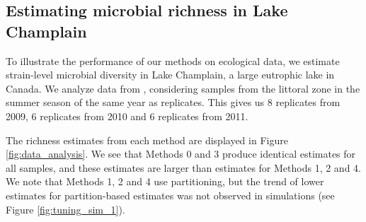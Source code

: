 \documentclass[12pt]{article}
\theoremstyle{break}
\theoremstyle{break}
\begin{document}
\subsection{Estimating microbial richness in Lake Champlain}

To illustrate the performance of our methods on ecological data, we estimate strain-level microbial diversity in Lake Champlain, a large eutrophic lake in Canada.  We analyze data from \citet{tromas_2017}, considering samples from the littoral zone in the summer season of the same year as replicates. This gives us 8 replicates from 2009, 6 replicates from 2010 and 6 replicates from 2011.  %





The richness estimates from each method are displayed in Figure \ref{fig:data_analysis}.  We see that Methods 0 and 3 produce identical estimates for all samples, and these estimates are larger than estimates for Methods 1, 2 and 4. We note that Methods 1, 2 and 4 use partitioning, but the trend of lower estimates for partition-based estimates was not observed in simulations (see Figure \ref{fig:tuning_sim_1}).
\end{document}
